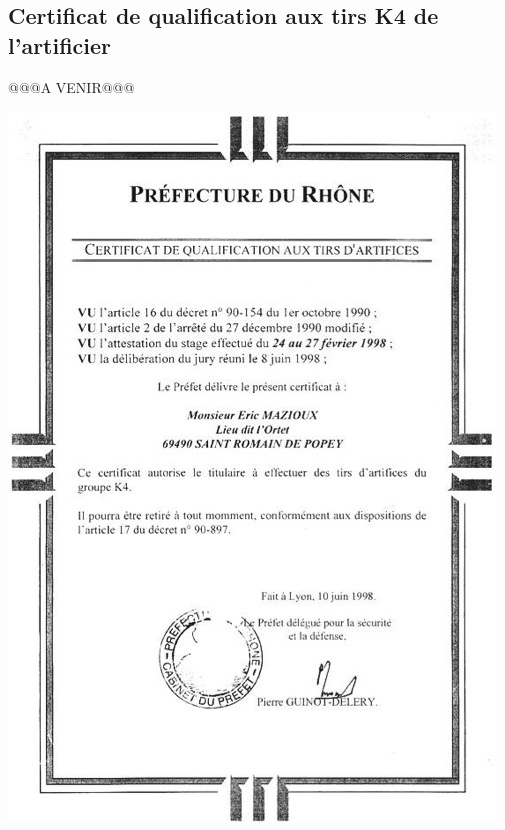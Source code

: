 \documentclass[hidelinks, paper=a4, fontsize=13pt]{report}
\begin{document}
\subsection{Certificat de qualification aux tirs K4 de l’artificier}
@@@A VENIR@@@
\begin{center}
\includegraphics[scale=0.75]{Annexes/Documents/CertificatArtifice}
\end{center}
\end{document}
